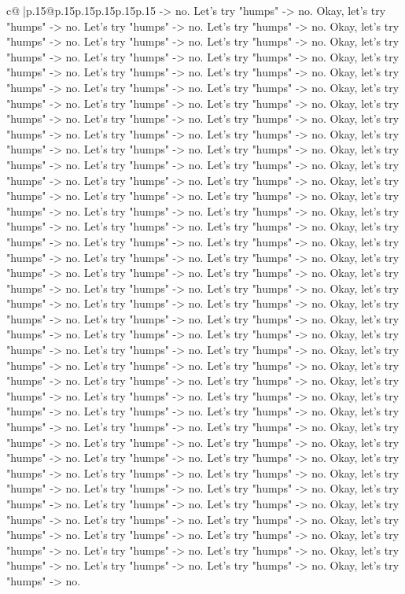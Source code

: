 \documentclass{article}
\begin{document}
{\begin{supertabular}{c@{$\;$}|p{.15\linewidth}@{}p{.15\linewidth}p{.15\linewidth}p{.15\linewidth}p{.15\linewidth}p{.15\linewidth}}
{{{{-}> no. Let's try "humps" {-}> no. Okay, let's try "humps" {-}> no. Let's try "humps" {-}> no. Let's try "humps" {-}> no. Okay, let's try "humps" {-}> no. Let's try "humps" {-}> no. Let's try "humps" {-}> no. Okay, let's try "humps" {-}> no. Let's try "humps" {-}> no. Let's try "humps" {-}> no. Okay, let's try "humps" {-}> no. Let's try "humps" {-}> no. Let's try "humps" {-}> no. Okay, let's try "humps" {-}> no. Let's try "humps" {-}> no. Let's try "humps" {-}> no. Okay, let's try "humps" {-}> no. Let's try "humps" {-}> no. Let's try "humps" {-}> no. Okay, let's try "humps" {-}> no. Let's try "humps" {-}> no. Let's try "humps" {-}> no. Okay, let's try "humps" {-}> no. Let's try "humps" {-}> no. Let's try "humps" {-}> no. Okay, let's try "humps" {-}> no. Let's try "humps" {-}> no. Let's try "humps" {-}> no. Okay, let's try "humps" {-}> no. Let's try "humps" {-}> no. Let's try "humps" {-}> no. Okay, let's try "humps" {-}> no. Let's try "humps" {-}> no. Let's try "humps" {-}> no. Okay, let's try "humps" {-}> no. Let's try "humps" {-}> no. Let's try "humps" {-}> no. Okay, let's try "humps" {-}> no. Let's try "humps" {-}> no. Let's try "humps" {-}> no. Okay, let's try "humps" {-}> no. Let's try "humps" {-}> no. Let's try "humps" {-}> no. Okay, let's try "humps" {-}> no. Let's try "humps" {-}> no. Let's try "humps" {-}> no. Okay, let's try "humps" {-}> no. Let's try "humps" {-}> no. Let's try "humps" {-}> no. Okay, let's try "humps" {-}> no. Let's try "humps" {-}> no. Let's try "humps" {-}> no. Okay, let's try "humps" {-}> no. Let's try "humps" {-}> no. Let's try "humps" {-}> no. Okay, let's try "humps" {-}> no. Let's try "humps" {-}> no. Let's try "humps" {-}> no. Okay, let's try "humps" {-}> no. Let's try "humps" {-}> no. Let's try "humps" {-}> no. Okay, let's try "humps" {-}> no. Let's try "humps" {-}> no. Let's try "humps" {-}> no. Okay, let's try "humps" {-}> no. Let's try "humps" {-}> no. Let's try "humps" {-}> no. Okay, let's try "humps" {-}> no. Let's try "humps" {-}> no. Let's try "humps" {-}> no. Okay, let's try "humps" {-}> no. Let's try "humps" {-}> no. Let's try "humps" {-}> no. Okay, let's try "humps" {-}> no. Let's try "humps" {-}> no. Let's try "humps" {-}> no. Okay, let's try "humps" {-}> no. Let's try "humps" {-}> no. Let's try "humps" {-}> no. Okay, let's try "humps" {-}> no. Let's try "humps" {-}> no. Let's try "humps" {-}> no. Okay, let's try "humps" {-}> no. Let's try "humps" {-}> no. Let's try "humps" {-}> no. Okay, let's try "humps" {-}> no. Let's try "humps" {-}> no. Let's try "humps" {-}> no. Okay, let's try "humps" {-}> no. Let's try "humps" {-}> no. Let's try "humps" {-}> no. Okay, let's try "humps" {-}> no. Let's try "humps" {-}> no. Let's try "humps" {-}> no. Okay, let's try "humps" {-}> no. Let's try "humps" {-}> no. Let's try "humps" {-}> no. Okay, let's try "humps" {-}> no. Let's try "humps" {-}> no. Let's try "humps" {-}> no. Okay, let's try "humps" {-}> no. Let's try "humps" {-}> no. Let's try "humps" {-}> no. Okay, let's try "humps" {-}> no. Let's try "humps" {-}> no. Let's try "humps" {-}> no. Okay, let's try "humps" {-}> no. Let's try "humps" {-}> no. Let's try "humps" {-}> no. Okay, let's try "humps" {-}> no. }}}
\end{supertabular}}
\end{document}
